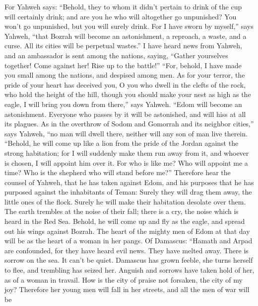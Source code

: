  For Yahweh says: ``Behold, they to whom it didn't pertain
to drink of the cup will certainly drink; and are you he who will
altogether go unpunished? You won't go unpunished, but you will surely
drink.  For I have sworn by myself,'' says Yahweh, ``that
Bozrah will become an astonishment, a reproach, a waste, and a curse.
All its cities will be perpetual wastes.''  I have heard
news from Yahweh, and an ambassador is sent among the nations, saying,
``Gather yourselves together! Come against her! Rise up to the battle!''
 ``For, behold, I have made you small among the nations,
and despised among men.  As for your terror, the pride of
your heart has deceived you, O you who dwell in the clefts of the rock,
who hold the height of the hill, though you should make your nest as
high as the eagle, I will bring you down from there,'' says Yahweh.
 ``Edom will become an astonishment. Everyone who passes by
it will be astonished, and will hiss at all its plagues. 
As in the overthrow of Sodom and Gomorrah and its neighbor cities,''
says Yahweh, ``no man will dwell there, neither will any son of man live
therein.  ``Behold, he will come up like a lion from the
pride of the Jordan against the strong habitation; for I will suddenly
make them run away from it, and whoever is chosen, I will appoint him
over it. For who is like me? Who will appoint me a time? Who is the
shepherd who will stand before me?''  Therefore hear the
counsel of Yahweh, that he has taken against Edom, and his purposes that
he has purposed against the inhabitants of Teman: Surely they will drag
them away, the little ones of the flock. Surely he will make their
habitation desolate over them.  The earth trembles at the
noise of their fall; there is a cry, the noise which is heard in the Red
Sea.  Behold, he will come up and fly as the eagle, and
spread out his wings against Bozrah. The heart of the mighty men of Edom
at that day will be as the heart of a woman in her pangs. 
Of Damascus: ``Hamath and Arpad are confounded, for they have heard evil
news. They have melted away. There is sorrow on the sea. It can't be
quiet.  Damascus has grown feeble, she turns herself to
flee, and trembling has seized her. Anguish and sorrows have taken hold
of her, as of a woman in travail.  How is the city of
praise not forsaken, the city of my joy?  Therefore her
young men will fall in her streets, and all the men of war will be
